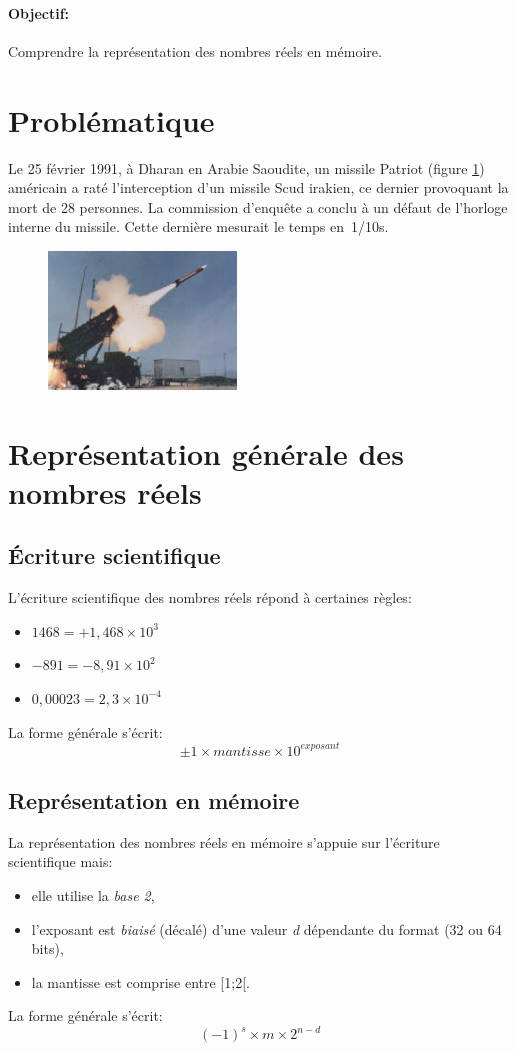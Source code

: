 \documentclass[a4paper,11pt]{article}
\begin{document}
\begin{Form}
\paragraph{Objectif:}Comprendre la représentation des nombres réels en mémoire.
\section{Problématique}
Le 25 février 1991, à Dharan en Arabie Saoudite, un missile Patriot (figure \ref{patriot}) américain a raté l’interception d’un missile Scud irakien, ce dernier provoquant la mort de 28 personnes. La commission d'enquête a conclu à un défaut de l'horloge interne du missile. Cette dernière mesurait le temps en~1/10s.
\begin{figure}[!h]
\centering
\includegraphics[width=5cm]{ressources/patriot.jpg}
\label{patriot}
\end{figure}
\begin{center}
\end{center}
\section{Représentation générale des nombres réels}
\subsection{Écriture scientifique}
L'écriture scientifique des nombres réels répond à certaines règles:
\begin{itemize}
\item $1468=+1,468×10^3$
\item $-891=-8,91×10^2$
\item $0,00023=2,3×10^{-4}$
\end{itemize}
La forme générale s'écrit:
$$\pm 1×mantisse×10^{exposant}$$
\subsection{Représentation en mémoire}
La représentation des nombres réels en mémoire s'appuie sur l'écriture scientifique mais:
\begin{itemize}
\item elle utilise la \emph{base 2},
\item l'exposant est \emph{biaisé} (décalé) d'une valeur \emph{d} dépendante du format (32 ou 64 bits),
\item la mantisse est comprise entre [1;2[.
\end{itemize}
La forme générale s'écrit:
$$(-1)^s×m×2^{n-d}$$

\end{Form}
\end{document}
